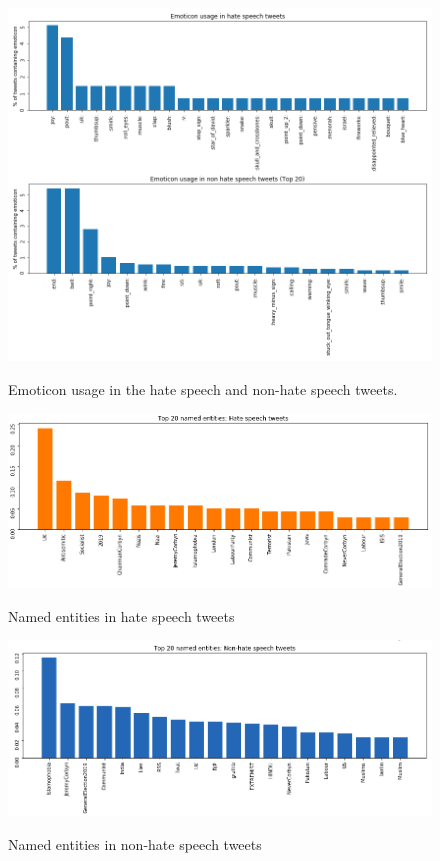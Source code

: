 \documentclass[conference]{IEEEtran}
\begin{document}
\begin{figure}[!t] 
    \centering 
    \includegraphics[width=5.0in]{emoticons} \label{fig:emoticon_usage} \hfil 
    \caption{Emoticon usage in the hate speech and non-hate speech tweets.}     
\end{figure} 

\begin{figure}[!t] 
  \centering 
  \includegraphics[width=5.0in]{entities_hate} \label{fig:entities_hate} \hfil 
  \caption{Named entities in hate speech tweets}     
\end{figure} 


\begin{figure}[!t] 
  \centering 
  \includegraphics[width=5.0in]{entities_no_hate} \label{fig:entities_non_hate} \hfil 
  \caption{Named entities in non-hate speech tweets}     
\end{figure} 
\end{document}
